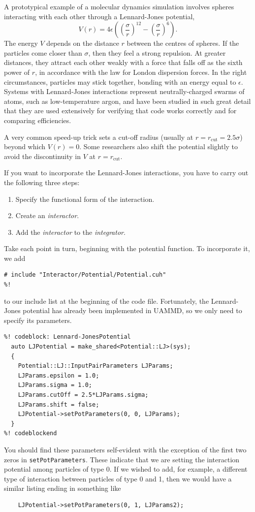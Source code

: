A prototypical example of a molecular dynamics simulation involves spheres 
interacting with each other through a Lennard-Jones potential,
\begin{equation*}
  V(r) = 4\epsilon\left(\left(\frac{\sigma}{r}\right)^{12}
                        - \left(\frac{\sigma}{r}\right)^6\right). 
\end{equation*}
The energy $V$ depends on the distance $r$ between the centres of spheres. If 
the particles come closer than $\sigma$, then they feel a strong repulsion. At
greater distances, they attract each other weakly with a force that falls off
as the sixth power of $r$, in accordance with the law for London dispersion
forces. In the right circumstances, particles may stick together, bonding with
an energy equal to $\epsilon$. Systems with Lennard-Jones interactions represent
neutrally-charged swarms of atoms, such as low-temperature argon, and have been
studied in such great detail that they are used extensively for verifying that
code works correctly and for comparing efficiencies.

A very common speed-up trick sets a cut-off radius (usually at
$r = r_{\mathrm{cut}} = 2.5 \sigma$) beyond which $V(r) = 0$. Some researchers
also shift the potential slightly to avoid the discontinuity in $V$ at
$r = r_{\mathrm{cut}}$.

If you want to incorporate the Lennard-Jones interactions, you have to carry out 
the following three steps:
\begin{enumerate}
  \item Specify the functional form of the interaction.
  \item Create an \textit{interactor}.
  \item Add the \textit{interactor} to the \textit{integrator}.
\end{enumerate}

Take each point in turn, beginning with the potential function. To incorporate
it, we add
\begin{lstlisting}
# include "Interactor/Potential/Potential.cuh"
%!
\end{lstlisting}
to our include list at the beginning of the code file. Fortunately, the
Lennard-Jones potential has already been implemented in UAMMD, so we
only need to specify its parameters.
\begin{lstlisting}
%! codeblock: Lennard-JonesPotential
  auto LJPotential = make_shared<Potential::LJ>(sys);
  {
    Potential::LJ::InputPairParameters LJParams;
    LJParams.epsilon = 1.0;
    LJParams.sigma = 1.0;
    LJParams.cutOff = 2.5*LJParams.sigma;
    LJParams.shift = false;
    LJPotential->setPotParameters(0, 0, LJParams);
  }
%! codeblockend
\end{lstlisting}
You should find these parameters self-evident with the exception of the first
two zeros in \texttt{setPotParameters}. These indicate that we are setting the
interaction potential among particles of type 0. If we wished to add, for
example, a different type of interaction between particles of type 0 and 1,
then we would have a similar listing ending in something like
\begin{lstlisting}
    LJPotential->setPotParameters(0, 1, LJParams2);
\end{lstlisting}

